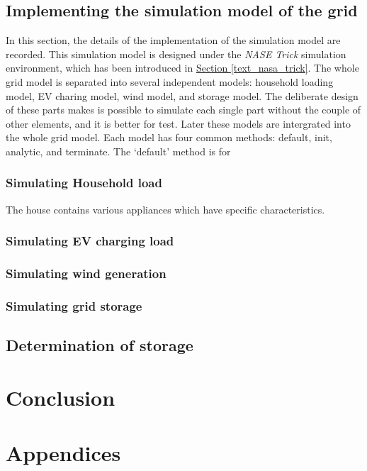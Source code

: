 \documentclass[12pt,a4paper]{report}
\begin{document}
            \section{Implementing the simulation model of the grid}
            In this section, the details of the implementation of the simulation model are recorded. This simulation model is designed under the \emph{NASE Trick} simulation environment, which has been introduced in \hyperref[text_nasa_trick]{Section \ref*{text_nasa_trick}}. The whole grid model is separated into several independent models: household loading model, EV charing model, wind model, and storage model. The deliberate design of these parts makes is possible to simulate each single part without the couple of other elements, and it is better for test. Later these models are intergrated into the whole grid model.
            Each model has four common methods: default, init, analytic, and terminate. The `default' method is for 
                \subsection{Simulating Household load}
                \label{text_simulatinghouseholdload}
                The house contains various appliances which have specific characteristics. 
                \subsection{Simulating EV charging load}
                \subsection{Simulating wind generation}
                \subsection{Simulating grid storage}
            \section{Determination of storage}

    \chapter{Conclusion}
    \chapter*{Appendices}
    \cleardoublepage  
    
    
\end{document}
